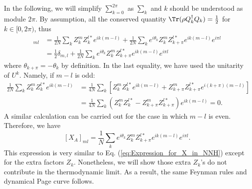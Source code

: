 In the following, we will simplify %
$\sum_{k=0}^{2\pi}$ as $\sum_{k}$
and $k$ should be understood as module $2\pi$. By assumption, all
the conserved quantity $\Tr(\rho Q_{k}^{\dagger}Q_{k})=\frac{1}{2}$
for $k\in[0,2\pi)$, thus
\begin{align*}
[C_A]_{ml} & =\frac{1}{2N}\sum_{k}Z_{k}^{m}Z_{k}^{l*}e^{ik(m-l)}+\frac{1}{2N}\sum_{k}e^{i\theta_{k}}Z_{k}^{m}Z_{k+\pi}^{l*}e^{ik(m-l)}e^{i\pi l}\\
 & =\frac{1}{2}\delta_{m,l}+\frac{1}{2N}\sum_{k}e^{i\theta_{k}}Z_{k}^{m}Z_{k+\pi}^{l*}e^{ik(m-l)}e^{i\pi l}
\end{align*}
where $\theta_{k+\pi}=-\theta_{k}$ by definition. In the last equality, we have
used the unitarity of $U^{k}$. Namely, if $m-l$ is odd:
\begin{align*}
\frac{1}{2N}\sum_{k}Z_{k}^{m}Z_{k}^{l*}e^{ik(m-l)} & =\frac{1}{4N}\sum_{k}[Z_{k}^{m}Z_{k}^{l*}e^{ik(m-l)}+Z_{k+\pi}^{m}Z_{k+\pi}^{l*}e^{i(k+\pi)(m-l)}]\\
 & =\frac{1}{4N}\sum_{k}(Z_{k}^{m}Z_{k}^{l*}-Z_{k+\pi}^{m}Z_{k+\pi}^{l*})e^{ik(m-l)}=0.
\end{align*}
A similar calculation can be carried out for the case in which %
$m-l$ is even. Therefore, we %
have 
\[
[X_A]_{ml}=\frac{1}{N}\sum_{k}e^{i\theta_{k}}Z_{k}^{m}Z_{k+\pi}^{l*}e^{ik(m-l)}e^{i\pi l}.
\]
This expression is very similar to Eq. (\ref{eq:Expression_for_X_in_NNH})
except for the extra factors %
$Z_{k}$. Nonetheless, we will show those extra
$Z_{k}$'s do %
not contribute %
in the thermodynamic limit. As a result,
the same Feynman rules and dynamical Page curve %
follows. 

